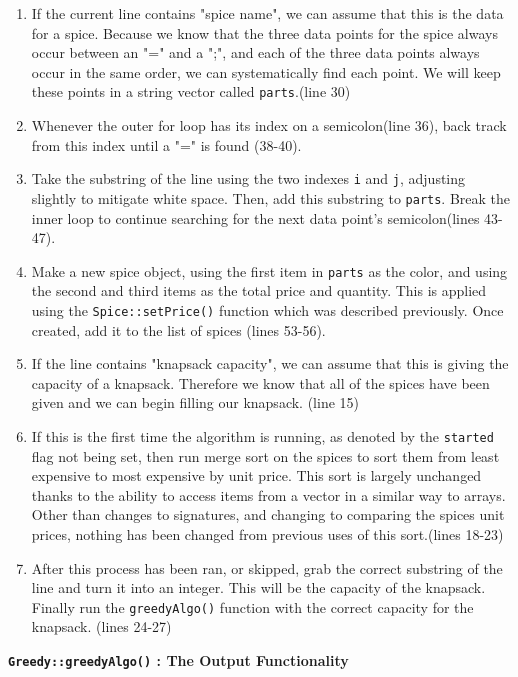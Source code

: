 \documentclass[letterpaper, 10pt]{article}
\begin{document}
\begin{enumerate}
    \item If the current line contains "spice name", we can assume that this is the data for a spice. Because we know that the three data points for the spice always occur between an "=" and a ";", and each of the three data points always occur in the same order, we can systematically find each point. We will keep these points in a string vector called \texttt{parts}.(line 30)
    \item Whenever the outer for loop has its index on a semicolon(line 36), back track from this index until a "=" is found (38-40).
    \item Take the substring of the line using the two indexes \texttt{i} and \texttt{j}, adjusting slightly to mitigate white space. Then, add this substring to \texttt{parts}. Break the inner loop to continue searching for the next data point's semicolon(lines 43-47).
    \item Make a new spice object, using the first item in \texttt{parts} as the color, and using the second and third items as the total price and quantity. This is applied using the \texttt{Spice::setPrice()} function which was described previously. Once created, add it to the list of spices (lines 53-56).
    \item If the line contains "knapsack capacity", we can assume that this is giving the capacity of a knapsack. Therefore we know that all of the spices have been given and we can begin filling our knapsack. (line 15)
    \item If this is the first time the algorithm is running, as denoted by the \texttt{started} flag not being set, then run merge sort on the spices to sort them from least expensive to most expensive by unit price. This sort is largely unchanged thanks to the ability to access items from a vector in a similar way to arrays. Other than changes to signatures, and changing to comparing the spices unit prices, nothing has been changed from previous uses of this sort.(lines 18-23)
    \item After this process has been ran, or skipped, grab the correct substring of the line and turn it into an integer. This will be the capacity of the knapsack. Finally run the \texttt{greedyAlgo()} function with the correct capacity for the knapsack. (lines 24-27)
\end{enumerate}


\textbf{\texttt{Greedy::greedyAlgo()} : The Output Functionality}
\end{document}
